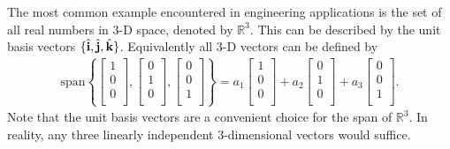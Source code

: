 The most common example encountered in engineering applications is the set of all real numbers in 3-D space, denoted by $\mathbb{R}^3$. This can be described by the unit basis vectors $\{ \hat{\mathbf{i}}, \hat{\mathbf{j}}, \hat{\mathbf{k}} \}$. Equivalently all 3-D vectors can be defined by
\begin{align}
  \text{span} \left\{ 
    \left[ \begin{array}{c} 1 \\  0 \\ 0 \\ \end{array} \right] ,
    \left[ \begin{array}{c} 0 \\  1 \\ 0 \\ \end{array} \right] ,
    \left[ \begin{array}{c} 0 \\  0 \\ 1 \\ \end{array} \right] \right\}
  = a_1 \left[ \begin{array}{c} 1 \\  0 \\ 0 \\ \end{array} \right] 
  + a_2 \left[ \begin{array}{c} 0 \\  1 \\ 0 \\ \end{array} \right]
  + a_3 \left[ \begin{array}{c} 0 \\  0 \\ 1 \\ \end{array} \right] .
\end{align}
Note that the unit basis vectors are a convenient choice for the span of $\mathbb{R}^3$. In reality, any three linearly independent 3-dimensional vectors would suffice.

